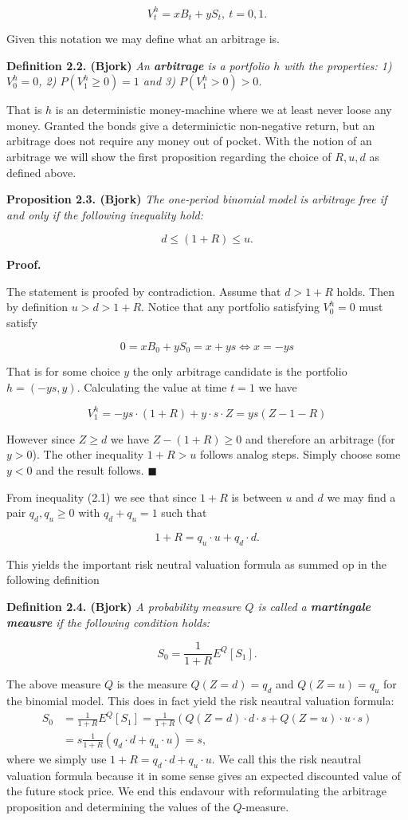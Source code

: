 \documentclass[a4paper,12pt,openany]{book}
\begin{document}
\[
V^h_t=xB_t+yS_t,\ t=0,1.
\]

Given this notation we may define what an arbitrage is.

\textbf{Definition 2.2. (Bjork)} \emph{An \textbf{arbitrage} is a portfolio \(h\) with the properties: 1) \(V^h_0=0\), 2) \(P(V^h_1\ge 0)=1\) and 3) \(P(V^h_1>0)>0\).}

That is \(h\) is an deterministic money-machine where we at least never loose any money. Granted the bonds give a determinictic non-negative return, but an arbitrage does not require any money out of pocket. With the notion of an arbitrage we will show the first proposition regarding the choice of \(R,u,d\) as defined above.

\textbf{Proposition 2.3. (Bjork)} \emph{The one-period binomial model is arbitrage free if and only if the following inequality hold:}

\[
d\le (1+R)\le u.\tag{2.1}
\]

\textbf{Proof.}

The statement is proofed by contradiction. Assume that \(d>1+R\) holds. Then by definition \(u>d>1+R\). Notice that any portfolio satisfying \(V_0^h=0\) must satisfy

\[
0=xB_0+yS_0=x+ys\iff x=-ys
\]

That is for some choice \(y\) the only arbitrage candidate is the portfolio \(h=(-ys,y)\). Calculating the value at time \(t=1\) we have

\[
V_1^h=-ys\cdot(1+R)+y\cdot s\cdot Z=ys(Z-1-R)
\]

However since \(Z\ge d\) we have \(Z-(1+R)\ge 0\) and therefore an arbitrage (for \(y>0\)). The other inequality \(1+R>u\) follows analog steps. Simply choose some \(y<0\) and the result follows. \(\blacksquare\)

From inequality (2.1) we see that since \(1+R\) is between \(u\) and \(d\) we may find a pair \(q_d,q_u\ge 0\) with \(q_d+q_u=1\) such that

\[
1+R=q_u\cdot u+q_d\cdot d.
\]

This yields the important risk neutral valuation formula as summed op in the following definition

\textbf{Definition 2.4. (Bjork)} \emph{A probability measure \(Q\) is called a \textbf{martingale meausre} if the following condition holds:}

\[
S_0=\frac{1}{1+R}E^Q[S_1].
\]

The above measure \(Q\) is the measure \(Q(Z=d)=q_d\) and \(Q(Z=u)=q_u\) for the binomial model. This does in fact yield the risk neautral valuation formula:
\begin{align*}
S_0&=\frac{1}{1+R}E^Q[S_1]=\frac{1}{1+R}(Q(Z=d)\cdot d\cdot s+Q(Z=u)\cdot u\cdot s)\\
&=s\frac{1}{1+R}(q_d\cdot d+q_u\cdot u)=s,
\end{align*}
where we simply use \(1+R=q_d\cdot d+q_u\cdot u\). We call this the risk neautral valuation formula because it in some sense gives an expected discounted value of the future stock price. We end this endavour with reformulating the arbitrage proposition and determining the values of the \(Q\)-measure.
\end{document}
